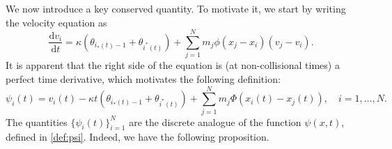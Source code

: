 \documentclass[11pt,reqno]{amsart}
\theoremstyle{definition}
\theoremstyle{remark}
\def\dd{\mathrm{d}}
\begin{document}
	We now introduce a key conserved quantity.  To motivate it, we start by writing the velocity equation as  
	\begin{equation}
		\label{e:vi2}
		\frac{\dd v_i}{\dd t} = \kappa( \theta_{i_*(t)-1} + \theta_{i^*(t)} ) + \sum_{j=1}^N m_j \phi(x_j - x_i) (v_j - v_i).
	\end{equation}
	It is apparent that the right side of the equation is (at non-collisional times) a perfect time derivative, which motivates the following definition:
	\begin{equation}\label{def:psiit}
		\psi_i(t) = v_i(t) - \kappa t (\theta_{i_*(t)-1}+\theta_{i^*(t)})  + \sum_{j=1}^N m_j \Phi(x_i(t) - x_j(t)),\quad i=1,\ldots,N.
	\end{equation}
	The quantities $\{\psi_i(t)\}_{i=1}^N$ are the discrete analogue of the function $\psi(x,t)$, defined in \eqref{def:psi}. Indeed, we have the following proposition.
	
\end{document}
